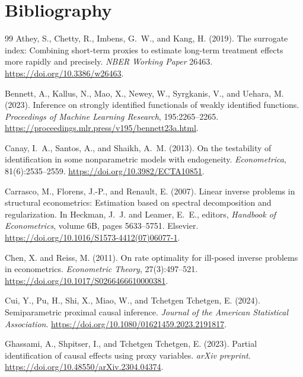 \documentclass[11pt]{article}
\theoremstyle{definition}
\theoremstyle{plain}
\theoremstyle{remark}
\begin{document}
\section*{Bibliography}
\begin{thebibliography}{99}
Athey, S., Chetty, R., Imbens, G.~W., and Kang, H. (2019).
\newblock The surrogate index: Combining short-term proxies to estimate
long-term treatment effects more rapidly and precisely.
\newblock \emph{NBER Working Paper} 26463.
\newblock \url{https://doi.org/10.3386/w26463}.

Bennett, A., Kallus, N., Mao, X., Newey, W., Syrgkanis, V., and Uehara, M.
(2023).
\newblock Inference on strongly identified functionals of weakly identified
functions.
\newblock \emph{Proceedings of Machine Learning Research}, 195:2265--2265.
\newblock \url{https://proceedings.mlr.press/v195/bennett23a.html}.

Canay, I.~A., Santos, A., and Shaikh, A.~M. (2013).
\newblock On the testability of identification in some nonparametric models
with endogeneity.
\newblock \emph{Econometrica}, 81(6):2535--2559.
\newblock \url{https://doi.org/10.3982/ECTA10851}.

Carrasco, M., Florens, J.-P., and Renault, E. (2007).
\newblock Linear inverse problems in structural econometrics: Estimation based
on spectral decomposition and regularization.
\newblock In Heckman, J.~J. and Leamer, E.~E., editors, \emph{Handbook of
Econometrics}, volume 6B, pages 5633--5751. Elsevier.
\newblock \url{https://doi.org/10.1016/S1573-4412(07)06077-1}.

Chen, X. and Reiss, M. (2011).
\newblock On rate optimality for ill-posed inverse problems in econometrics.
\newblock \emph{Econometric Theory}, 27(3):497--521.
\newblock \url{https://doi.org/10.1017/S0266466610000381}.

Cui, Y., Pu, H., Shi, X., Miao, W., and Tchetgen Tchetgen, E. (2024).
\newblock Semiparametric proximal causal inference.
\newblock \emph{Journal of the American Statistical Association}.
\newblock \url{https://doi.org/10.1080/01621459.2023.2191817}.

Ghassami, A., Shpitser, I., and Tchetgen Tchetgen, E. (2023).
\newblock Partial identification of causal effects using proxy variables.
\newblock \emph{arXiv preprint}.
\newblock \url{https://doi.org/10.48550/arXiv.2304.04374}.


\end{thebibliography}
\end{document}
